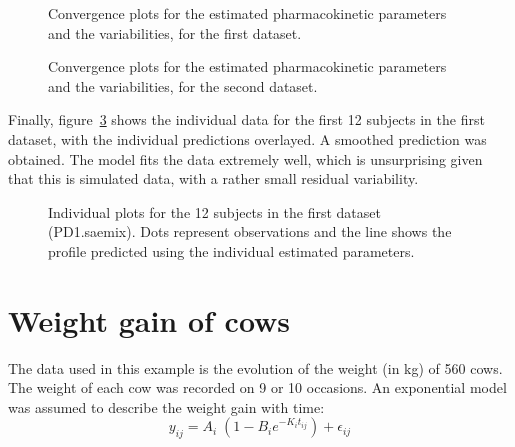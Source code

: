{\begin{figure}[!h]
\begin{center}
\par \kern -1cm
\end{center}
\par \kern -0.5cm
\caption{Convergence plots for the estimated pharmacokinetic parameters and the variabilities, for the first dataset.} \label{fig:convergPD1}
\end{figure}

\clearpage
\begin{figure}[!h]
\begin{center}
\par \kern -1cm
\end{center}
\par \kern -0.5cm
\caption{Convergence plots for the estimated pharmacokinetic parameters and the variabilities, for the second dataset.} \label{fig:convergPD2}
\end{figure}

\bigskip
Finally, figure~\ref{fig:PDindividual} shows the individual data for the first 12 subjects in the first dataset, with the individual predictions overlayed. A smoothed prediction was obtained. The model fits the data extremely well, which is unsurprising given that this is simulated data, with a rather small residual variability.

\begin{figure}[!h]
\begin{center}
\par \kern -1cm
\end{center}
\par \kern -0.5cm
\caption{Individual plots for the 12 subjects in the first dataset ({\sf PD1.saemix}). Dots represent observations and the line shows the profile predicted using the individual estimated parameters.} \label{fig:PDindividual}
\end{figure}

\clearpage
\newpage


\section{Weight gain of cows} \label{sec:examplecow}

The data used in this example is the evolution of the weight (in kg) of 560 cows. The weight of each cow was recorded on 9 or 10 occasions. An exponential model was assumed to describe the weight gain with time:
\begin{equation}
y_{ij} = A_{i} \; \left( 1- B_i e^{-K_i t_{ij}} \right) + \epsilon_{ij}
\end{equation}

}
